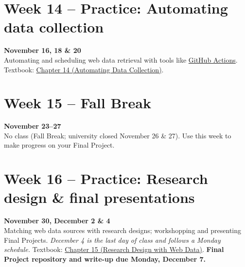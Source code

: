 \documentclass[11pt]{memoir}
\def\bookurl{https://cuinfoscience.github.io/Web-Data-Science-Book/}
\newcommand{\bookch}[2]{\href{\bookurl#1.html}{#2}}
\begin{document}
\section{Week 14 -- Practice: Automating data collection}
\textcolor{CUGold}{\textbf{November 16, 18 \& 20}}\\
Automating and scheduling web data retrieval with tools like \href{https://docs.github.com/en/actions}{GitHub Actions}. Textbook: \bookch{ch-14-automation}{Chapter 14 (Automating Data Collection)}.

\section{Week 15 -- Fall Break}
\textcolor{CUGold}{\textbf{November 23--27}}\\
No class (Fall Break; university closed November 26 \& 27). Use this week to make progress on your Final Project.

\section{Week 16 -- Practice: Research design \& final presentations}
\textcolor{CUGold}{\textbf{November 30, December 2 \& 4}}\\
Matching web data sources with research designs; workshopping and presenting Final Projects. \textit{December 4 is the last day of class and follows a Monday schedule.} Textbook: \bookch{ch-15-research-design}{Chapter 15 (Research Design with Web Data)}. \textbf{Final Project repository and write-up due Monday, December 7.}



\renewcommand{\bibsection}{\section{\huge \bibname}\prebibhook}
\baselineskip 14.2pt

\end{document}
